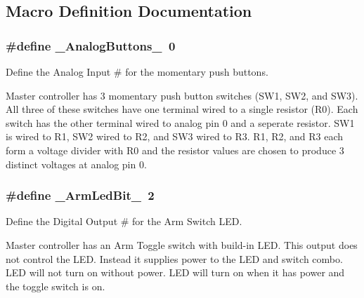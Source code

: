 \subsection{Macro Definition Documentation}
\subsubsection[{\texorpdfstring{\+\_\+\+Analog\+Buttons\+\_\+}{\_AnalogButtons\_}}]{\setlength{\rightskip}{0pt plus 5cm}\#define \+\_\+\+Analog\+Buttons\+\_\+~0}\hypertarget{masterPanel_8ino_a150478a9ca6eefa513c0a36f788bf8bd}{}\label{masterPanel_8ino_a150478a9ca6eefa513c0a36f788bf8bd}


Define the Analog Input \# for the momentary push buttons. 

Master controller has 3 momentary push button switches (S\+W1, S\+W2, and S\+W3). All three of these switches have one terminal wired to a single resistor (R0). Each switch has the other terminal wired to analog pin 0 and a seperate resistor. S\+W1 is wired to R1, S\+W2 wired to R2, and S\+W3 wired to R3. R1, R2, and R3 each form a voltage divider with R0 and the resistor values are chosen to produce 3 distinct voltages at analog pin 0. 
\subsubsection[{\texorpdfstring{\+\_\+\+Arm\+Led\+Bit\+\_\+}{\_ArmLedBit\_}}]{\setlength{\rightskip}{0pt plus 5cm}\#define \+\_\+\+Arm\+Led\+Bit\+\_\+~2}\hypertarget{masterPanel_8ino_abeac387ee946b831a2d5f3ea8efa2cd6}{}\label{masterPanel_8ino_abeac387ee946b831a2d5f3ea8efa2cd6}


Define the Digital Output \# for the Arm Switch L\+ED. 

Master controller has an Arm Toggle switch with build-\/in L\+ED. This output does not control the L\+ED. Instead it supplies power to the L\+ED and switch combo. L\+ED will not turn on without power. L\+ED will turn on when it has power and the toggle switch is on. 
